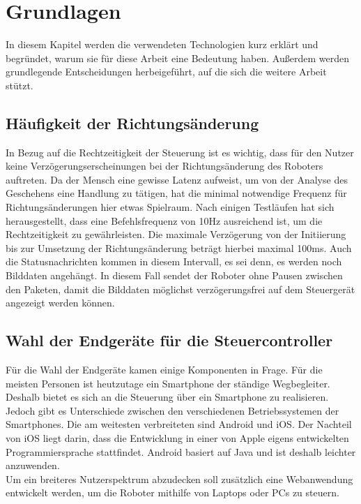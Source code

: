 \chapter{Grundlagen}
\label{ch:Grundlagen}

In diesem Kapitel werden die verwendeten Technologien kurz erklärt und begründet, warum sie für diese Arbeit eine Bedeutung haben. Außerdem werden grundlegende Entscheidungen herbeigeführt, auf die sich die weitere Arbeit stützt.

\section{Häufigkeit der Richtungsänderung}
In Bezug auf die Rechtzeitigkeit der Steuerung ist es wichtig, dass für den Nutzer keine Verzögerungserscheinungen bei der Richtungsänderung des Roboters auftreten. Da der Mensch eine gewisse Latenz aufweist, um von der Analyse des Geschehens eine Handlung zu tätigen, hat die minimal notwendige Frequenz für Richtungsänderungen hier etwas Spielraum. Nach einigen Testläufen hat sich herausgestellt, dass eine Befehlsfrequenz von 10Hz ausreichend ist, um die Rechtzeitigkeit zu gewährleisten. Die maximale Verzögerung von der Initiierung bis zur Umsetzung der Richtungsänderung beträgt hierbei maximal 100ms. Auch die Statusnachrichten kommen in diesem Intervall, es sei denn, es werden noch Bilddaten angehängt. In diesem Fall sendet der Roboter ohne Pausen zwischen den Paketen, damit die Bilddaten möglichst verzögerungsfrei auf dem Steuergerät angezeigt werden können. 


\section{Wahl der Endgeräte für die Steuercontroller}
\label{sec:wahl_endgeraete}
Für die Wahl der Endgeräte kamen einige Komponenten in Frage. Für die meisten Personen ist heutzutage ein Smartphone der ständige Wegbegleiter. Deshalb bietet es sich an die Steuerung über ein Smartphone zu realisieren. Jedoch gibt es Unterschiede zwischen den verschiedenen Betriebssystemen der Smartphones. Die am weitesten verbreiteten sind Android und iOS. Der Nachteil von iOS liegt darin, dass die Entwicklung in einer von Apple eigens entwickelten Programmiersprache stattfindet. Android basiert auf Java und ist deshalb leichter anzuwenden. \\
Um ein breiteres Nutzerspektrum abzudecken soll zusätzlich eine Webanwendung entwickelt werden, um die Roboter mithilfe von Laptops oder PCs zu steuern. 


